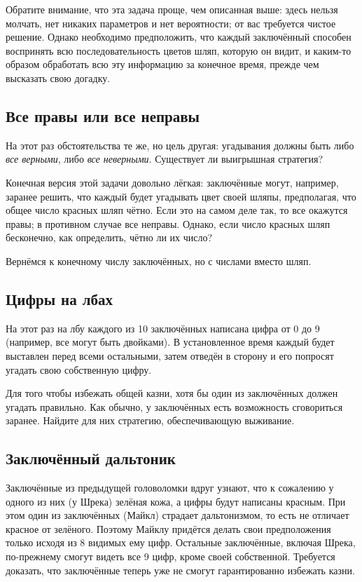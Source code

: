 Обратите внимание, что эта задача проще, чем описанная выше:
здесь нельзя молчать, нет никаких параметров и нет вероятности;
от вас требуется чистое решение.
Однако необходимо предположить, что каждый заключённый способен воспринять всю последовательность цветов шляп, которую он видит, и каким-то образом обработать всю эту информацию за конечное время, прежде чем высказать свою догадку.


\subsection*{Все правы или все неправы}

На этот раз обстоятельства те же, но цель другая:
угадывания должны быть либо \emph{все верными}, либо \emph{все неверными}.
Существует ли выигрышная стратегия?

Конечная версия этой задачи довольно лёгкая:
заключённые могут, например, заранее решить, что каждый будет угадывать цвет своей шляпы, предполагая, что общее число красных шляп чётно.
Если это на самом деле так, то все окажутся правы;
в противном случае все неправы.
Однако, если число красных шляп бесконечно, как определить, чётно ли их число?

\medskip

Вернёмся к конечному числу заключённых, но с числами вместо шляп.

\subsection*{Цифры на лбах}

На этот раз на лбу каждого из 10 заключённых написана цифра от 0 до 9 (например, все могут быть двойками).
В установленное время каждый будет выставлен перед всеми остальными, затем отведён в сторону и его попросят угадать свою собственную цифру.

Для того чтобы избежать общей казни, хотя бы один из заключённых должен угадать правильно.
Как обычно, у заключённых есть возможность сговориться заранее.
Найдите для них стратегию, обеспечивающую выживание.

\subsection*{Заключённый дальтоник}

Заключённые из предыдущей головоломки вдруг узнают, что к сожалению у одного из них (у Шрека) зелёная кожа,
а цифры будут написаны красным.
При этом один из заключённых (Майкл) страдает дальтонизмом, то есть не отличает красное от зелёного.
Поэтому Майклу придётся делать свои предположения только исходя из 8 видимых ему цифр.
Остальные заключённые, включая Шрека, по-прежнему смогут видеть все 9 цифр, кроме своей собственной.
Требуется доказать, что заключённые теперь уже не смогут гарантированно избежать казни.

